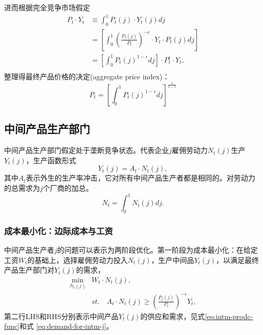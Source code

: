 进而根据完全竞争市场假定
\begin{equation*}
  \begin{split}
    P_t \cdot Y_t & \equiv \int_0^1 P_t(j) \cdot Y_t(j) dj \\
    &=\left[\int_0^1 \left(\frac{P_t(j)}{P_t}\right)^{-\epsilon} \cdot Y_t \cdot P_t(j) dj \right] \\
    &=\left[\int_0^1 P_t(j)^{1-\epsilon} dj \right] \cdot P_t^{\epsilon} \cdot Y_t,\\
  \end{split}
\end{equation*}
整理得最终产品价格的决定(aggregate price index)：
\begin{equation}
  \label{eq:agg-price-index}
  P_t = \left[
    \int_0^1 P_t(j)^{1-\epsilon} dj
  \right]^{\frac{1}{1-\epsilon}}
\end{equation}

\subsection{中间产品生产部门}
\label{sec:Basic-NK-model-intm-produc-firm-sector}
中间产品生产部门假定处于垄断竞争状态。代表企业$j$雇佣劳动力$N_t(j)$生产$Y_t(j)$，生产函数形式
\begin{equation}
  \label{eq:intm-prodc-func}
  Y_t(j) = A_t \cdot N_t(j),
\end{equation}
其中$A_t$表示外生的生产率冲击，它对所有中间产品生产者都是相同的。对劳动力的总需求为$j$个厂商的加总。
\begin{equation}
  \label{eq:Labor-D-S}
  N_t = \int_0^1 N_t(j)dj.
\end{equation}

\subsubsection{成本最小化：边际成本与工资}
\label{sec:intm-min-cost}
中间产品生产者$j$的问题可以表示为两阶段优化。第一阶段为成本最小化：在给定工资$W_t$的基础上，选择雇佣劳动力投入$N_t(j)$，生产中间品$Y_t(j)$，以满足最终产品生产部门对$Y_t(j)$的需求，
\begin{equation}
  \label{eq:intm-prod-max-N}
  \begin{split}
      \min_{N_t(j)} &W_t \cdot N_t(j),\\
      &st. \quad A_t \cdot N_t(j) \ge \left( \frac{P_t(j)}{P_t}\right)^{-\epsilon} Y_t,
  \end{split}
\end{equation}
第二行LHS和RHS分别表示中间产品$Y_t(j)$的供应和需求，见式\eqref{eq:intm-prodc-func}和式 \eqref{eq:demand-for-intm-j}。

